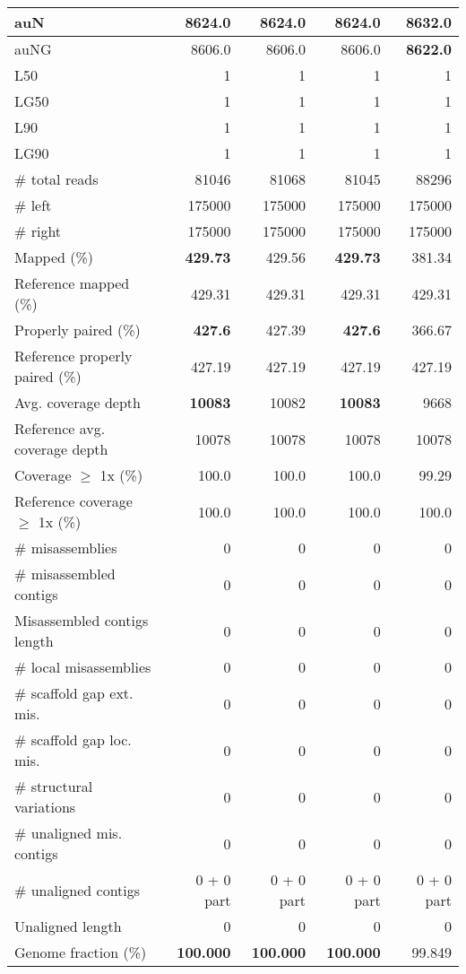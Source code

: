 \documentclass[12pt,a4paper]{article}
\begin{document}
\begin{table}[ht]
\begin{center}
\begin{tabular}{|l*{4}{|r}|}
auN & 8624.0 & 8624.0 & 8624.0 & {\bf 8632.0} \\ \hline
auNG & 8606.0 & 8606.0 & 8606.0 & {\bf 8622.0} \\ \hline
L50 & 1 & 1 & 1 & 1 \\ \hline
LG50 & 1 & 1 & 1 & 1 \\ \hline
L90 & 1 & 1 & 1 & 1 \\ \hline
LG90 & 1 & 1 & 1 & 1 \\ \hline
\# total reads & 81046 & 81068 & 81045 & 88296 \\ \hline
\# left & 175000 & 175000 & 175000 & 175000 \\ \hline
\# right & 175000 & 175000 & 175000 & 175000 \\ \hline
Mapped (\%) & {\bf 429.73} & 429.56 & {\bf 429.73} & 381.34 \\ \hline
Reference mapped (\%) & 429.31 & 429.31 & 429.31 & 429.31 \\ \hline
Properly paired (\%) & {\bf 427.6} & 427.39 & {\bf 427.6} & 366.67 \\ \hline
Reference properly paired (\%) & 427.19 & 427.19 & 427.19 & 427.19 \\ \hline
Avg. coverage depth & {\bf 10083} & 10082 & {\bf 10083} & 9668 \\ \hline
Reference avg. coverage depth & 10078 & 10078 & 10078 & 10078 \\ \hline
Coverage $\geq$ 1x (\%) & 100.0 & 100.0 & 100.0 & 99.29 \\ \hline
Reference coverage $\geq$ 1x (\%) & 100.0 & 100.0 & 100.0 & 100.0 \\ \hline
\# misassemblies & 0 & 0 & 0 & 0 \\ \hline
\# misassembled contigs & 0 & 0 & 0 & 0 \\ \hline
Misassembled contigs length & 0 & 0 & 0 & 0 \\ \hline
\# local misassemblies & 0 & 0 & 0 & 0 \\ \hline
\# scaffold gap ext. mis. & 0 & 0 & 0 & 0 \\ \hline
\# scaffold gap loc. mis. & 0 & 0 & 0 & 0 \\ \hline
\# structural variations & 0 & 0 & 0 & 0 \\ \hline
\# unaligned mis. contigs & 0 & 0 & 0 & 0 \\ \hline
\# unaligned contigs & 0 + 0 part & 0 + 0 part & 0 + 0 part & 0 + 0 part \\ \hline
Unaligned length & 0 & 0 & 0 & 0 \\ \hline
Genome fraction (\%) & {\bf 100.000} & {\bf 100.000} & {\bf 100.000} & 99.849 \\ \hline

\end{tabular}
\end{center}
\end{table}
\end{document}
